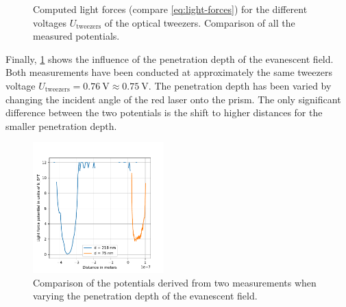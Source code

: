 \documentclass[../bericht.tex]{subfiles}
\begin{document}
      \begin{figure}[tb]
        \centering
        \hfill
        \caption{\protect{} Computed light forces (compare \cref{eq:light-forces}) for the different voltages $U_\mathrm{tweezers}$ of the optical tweezers. \protect{} Comparison of all the measured potentials.}
      \end{figure}

      Finally, \cref{fig:two-blocks} shows the influence of the penetration depth of the evanescent field. Both measurements have been conducted at approximately the same tweezers voltage $U_\mathrm{tweezers}=\SI{0,76}{\volt}\approx \SI{0,75}{\volt}$. The penetration depth has been varied by changing the incident angle of the red laser onto the prism. The only significant difference between the two potentials is the shift to higher distances for the smaller penetration depth.

      \begin{figure}[tbh]
        \centering
        \includegraphics[width=0.45\textwidth]{figures/potentials12.pdf}
        \caption{Comparison of the potentials derived from two measurements when varying the penetration depth of the evanescent field.}
        \label{fig:two-blocks}
      \end{figure}
\end{document}
